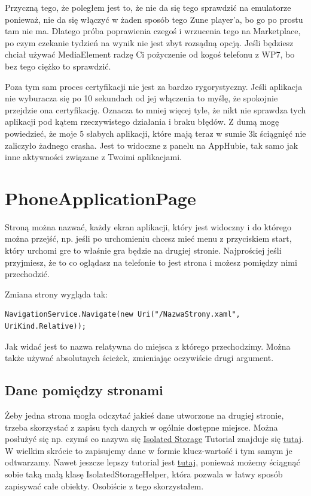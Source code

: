 \documentclass[12pt, a4paper]{article}
\begin{document}
 Przyczną tego, że poległem jest to, że nie da się tego sprawdzić na emulatorze
 ponieważ, nie da się włączyć w żaden sposób tego Zune player'a, bo go po prostu
 tam nie ma. Dlatego próba poprawienia czegoś i wrzucenia tego na Marketplace,
 po czym czekanie tydzień na wynik nie jest zbyt rozsądną opcją. Jeśli będziesz
 chciał używać MediaElement radzę Ci pożyczenie od kogoś telefonu z WP7, bo bez
 tego ciężko to sprawdzić.
 
 Poza tym sam proces certyfikacji nie jest za bardzo rygorystyczny. Jeśli
 aplikacja nie wyburacza się po 10 sekundach od jej włączenia to myślę, że
 spokojnie przejdzie ona certyfikację. Oznacza to mniej więcej tyle, że nikt nie
 sprawdza tych aplikacji pod kątem rzeczywistego działania i braku błędów. Z
 dumą mogę powiedzieć, że moje 5 słabych aplikacji, które mają teraz w sumie 3k
 ściągnięć nie zaliczyło żadnego crasha. Jest to widoczne z panelu na AppHubie,
 tak samo jak inne aktywności związane z Twoimi aplikacjami.

\section{PhoneApplicationPage}
Stroną można nazwać, każdy ekran aplikacji, który jest widoczny i do
którego można przejść, np. jeśli po urchomieniu chcesz mieć menu z przyciskiem
start, który urchomi gre to właśnie gra będzie na drugiej stronie. Najprościej
jeśli przyjmiesz, że to co oglądasz na telefonie to jest strona i możesz
pomiędzy nimi przechodzić.

Zmiana strony wygląda tak:
\begin{lstlisting}
NavigationService.Navigate(new Uri("/NazwaStrony.xaml", UriKind.Relative));
\end{lstlisting} 

Jak widać jest to nazwa relatywna do miejsca z którego przechodzimy. Można także
używać absolutnych ścieżek, zmieniając oczywiście drugi argument.

\subsection{Dane pomiędzy stronami}
Żeby jedna strona mogła odczytać jakieś dane utworzone na drugiej stronie,
trzeba skorzystać z zapisu tych danych w ogólnie dostępne miejsce. Można
posłużyć się np. czymś co nazywa się
\href{http://msdn.microsoft.com/en-us/library/ff402541%28v=vs.92%29.aspx}{Isolated
 Storage}
Tutorial znajduje się
\href{http://create.msdn.com/en-US/education/quickstarts/Isolated_Storage}{tutaj}.
W wielkim skrócie to zapisujemy dane w formie klucz-wartość i tym samym je
odtwarzamy. Nawet jeszcze lepszy tutorial jest 
\href{http://msdn.microsoft.com/en-us/windowsphonetrainingcourse_yourfirstwp7applab_topic4#_Toc306647178}{tutaj},
ponieważ możemy ściągnąć sobie taką małą klasę IsolatedStorageHelper, która
pozwala w łatwy sposób zapisywać całe obiekty. Osobiście z tego skorzystałem.
\end{document}
